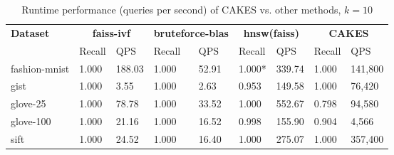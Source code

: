 \begin{table*}[!t]
    \caption{Runtime performance (queries per second) of CAKES vs. other methods, $k=10$}
    \label{table:results:ann-10}
    \vskip 0.15in
    \begin{center}
        \begin{small}
            \begin{sc}
                \begin{tabular}{|l|p{1cm}|p{1cm}|p{1cm}|p{1cm}|p{1cm}|p{1cm}|p{1cm}|p{1cm}|}
                    \hline
                    \textbf{Dataset}  & \multicolumn{2}{|c|}{\textbf{faiss-ivf}} & \multicolumn{2}{|c|}{\textbf{bruteforce-blas}} & \multicolumn{2}{|c|}{\textbf{hnsw(faiss)}} & \multicolumn{2}{|c|}{\textbf{CAKES}} \\
                    \cline{2-9}
                    &               Recall & QPS      & Recall & QPS    & Recall & QPS    & Recall & QPS \\
                    \hline
                    fashion-mnist & 1.000  & 188.03    & 1.000 & 52.91  & 1.000* & 339.74 & 1.000 & 141,800 \\
                    \hline
                    gist          & 1.000 & 3.55  & 1.000 & 2.63        & 0.953 & 149.58  & 1.000 & 76,420 \\
                    \hline
                    glove-25      & 1.000 & 78.78  & 1.000 & 33.52      & 1.000 & 552.67  & 0.798 & 94,580 \\
                    \hline
                    glove-100     & 1.000 & 21.16  & 1.000 & 16.52      & 0.998 & 155.90  & 0.904 & 4,566 \\
                    \hline
                    sift          & 1.000 &  24.52 & 1.000 & 16.40      & 1.000 & 275.07  & 1.000 & 357,400 \\
                    \hline
                \end{tabular}
            \end{sc}
        \end{small}
    \end{center}
    \vskip -0.1in
\end{table*}

